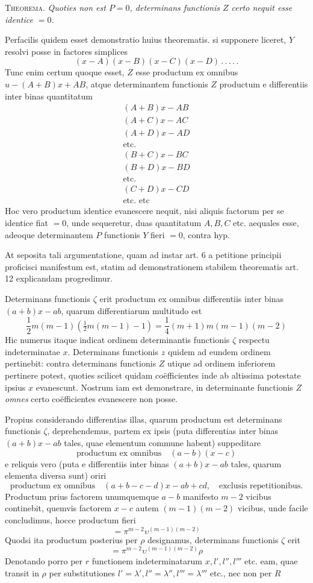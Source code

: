 \textsc{Theorema.} \textit{Quoties non est $P=0$, determinans functionis $Z$ certo nequit
esse identice $=0$.}

Perfacilis quidem esset demonstratio huius theorematis. si supponere liceret, $Y$ resolvi posse in factores simplices
\[
(x-A)(x-B)(x-C)(x-D)\, .\, .\, .\, .\, .
\]
Tunc enim certum quoque esset, $Z$ esse productum ex omnibus $u-(A+B)x+AB$,
atque determinantem functionis $Z$ productum e differentiis inter binas quantitatum
\[
\begin{gathered}
(A+B)x-AB\\
(A+C)x-AC\\
(A+D)x-AD\\
\text{etc.}\\
(B+C)x-BC\\
(B+D)x-BD\\
\text{etc.}\\
(C+D)x-CD\\
\text{etc. etc}
\end{gathered}
\]
Hoc vero productum identice evanescere nequit, nisi aliquis factorum per se identice fiat $=0$, unde sequeretur, duas quantitatum $A,B,C$ etc. aequales esse,
adeoque determinantem $P$ functionis $Y$ fieri $=0$, contra hyp.

At seposita tali argumentatione, quam ad instar art. 6 a petitione principii
proficisci manifestum est, statim ad demonstrationem stabilem theorematis art. 12
explicandam progredimur.

Determinans functionis $\zeta$ erit productum ex omnibus differentiis inter binas $(a+b)x-ab$, quarum differentiarum multitudo est
\[
\frac12m(m-1)(\tfrac12m(m-1)-1)=\frac14(m+1)m(m-1)(m-2)
\]
Hic numerus itaque indicat ordinem determinantis functionis $\zeta$ respectu indeterminatae $x$. Determinans functionis $z$ quidem ad eundem ordinem pertinebit:
contra determinans functionis $Z$ utique ad ordinem inferiorem pertinere potest,
quoties scilicet quidam coëfficientes inde ab altissima potestate ipsius $x$ evanescunt.
Nostrum iam est demonstrare, in determinante functionis $Z$ \textit{omnes} certo coëfficientes evanescere non posse.

Propius considerando differentias illas, quarum productum est determinans functionis $\zeta$, deprehendemus, partem ex ipsis (puta differentias inter binas
$(a+b)x-ab$ tales, quae elementum commune habent) suppeditare
\[
\text{productum ex omnibus}\quad(a-b)(x-c)
\]
e reliquis vero (puta e differentiis inter binas $(a+b)x-ab$ tales, quarum elementa diversa sunt) oriri
\[
\text{productum ex omnibus}\quad(a+b-c-d)x-ab+cd,\quad\text{exclusis repetitionibus.}
\]
Productum prius factorem unumquemque $a-b$ manifesto $m-2$ vicibus continebit, quemvis factorem $x-c$ autem $(m-1)(m-2)$ vicibus, unde facile concludimus, hocce productum fieri
\[
=\pi^{m-2}\upsilon^{(m-1)(m-2)}
\]
Quodsi ita productum posterius per $\rho$ designamus, determinans functionis $\zeta$ erit
\[
=\pi^{m-2}\upsilon^{(m-1)(m-2)}\rho
\]
Denotando porro per $r$ functionem indeterminatarum $x,l',l'',l'''$ etc. eam, quae
transit in $\rho$ per substitutiones $l'=\lambda',l''=\lambda'',l'''=\lambda'''$ etc., nec non per $R$
